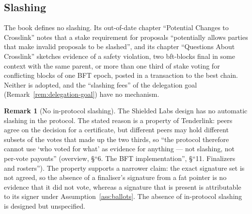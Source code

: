 \documentclass[11pt,a4paper]{article}
\theoremstyle{definition}
\newtheorem{remark}[theorem]{Remark}
\begin{document}
\subsection{Slashing}\label{sec:fs-slashing}

The book defines no slashing. Its out-of-date chapter ``Potential Changes to
Crosslink'' notes that a stake requirement for proposals ``potentially
allows parties that make invalid proposals to be slashed'', and its chapter
``Questions About Crosslink'' sketches evidence of a safety violation, two
bft-blocks final in some context with the same parent, or more than one
third of stake voting for conflicting blocks of one BFT epoch, posted in a
transaction to the best chain. Neither is adopted, and the ``slashing fees''
of the delegation goal (Remark~\ref{rem:delegation-goal}) have no mechanism.

\begin{remark}[No in-protocol slashing]\label{rem:no-slashing}
The Shielded Labs design has no automatic slashing in the protocol. The
stated reason is a property of Tenderlink: peers agree on the decision for
a certificate, but different peers may hold different subsets of the votes
that made up the two thirds, so ``the protocol therefore cannot use `who
voted for what' as evidence for anything --- not slashing, not per-vote
payouts'' (overview, \S``6. The BFT implementation'', \S``11. Finalizers and
rosters''). The property supports a narrower claim: the exact signature set
is not agreed, so the absence of a finaliser's signature from a fat pointer
is no evidence that it did not vote, whereas a signature that is present is
attributable to its signer under Assumption~\ref{ass:ballots}. The
absence of in-protocol slashing is designed but unspecified.
\end{remark}
\end{document}
